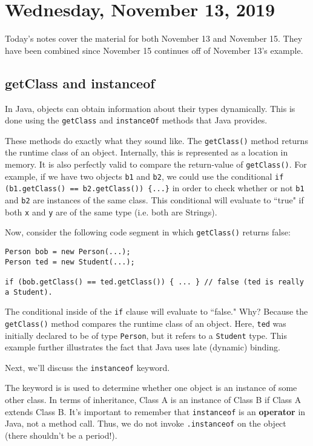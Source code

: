 \section{Wednesday, November 13, 2019}

Today's notes cover the material for both November 13 and November 15. They have been combined since November 15 continues off of November 13's example.

\subsection{getClass and instanceof}

In Java, objects can obtain information about their types dynamically. This is done using the \verb!getClass! and \verb!instanceOf! methods that Java provides. 


These methods do exactly what they sound like. The \verb!getClass()! method returns the runtime class of an object. Internally, this is represented as a location in memory. It is also perfectly valid to compare the return-value of \verb!getClass()!. For example, if we have two objects \verb!b1! and \verb!b2!, we could use the conditional \verb!if (b1.getClass() == b2.getClass()) {...}! in order to check whether or not \verb!b1! and \verb!b2! are instances of the same class. This conditional will evaluate to ``true" if both \verb!x! and \verb!y! are of the same type (i.e. both are Strings).


Now, consider the following code segment in which \verb!getClass()! returns false:

\begin{lstlisting}
Person bob = new Person(...);
Person ted = new Student(...);

if (bob.getClass() == ted.getClass()) { ... } // false (ted is really a Student).
\end{lstlisting}

The conditional inside of the \verb!if! clause will evaluate to ``false." Why? Because the \verb!getClass()! method compares the runtime class of an object. Here, \verb!ted! was initially declared to be of type \verb!Person!, but it refers to a \verb!Student! type. This example further illustrates the fact that Java uses late (dynamic) binding.



Next, we'll discuss the \verb!instanceof! keyword.

The \verb@instanceof@ keyword is is used to determine whether one object is an instance of some other class. In terms of inheritance, Class A is an instance of Class B if Class A extends Class B. It's important to remember that \verb!instanceof! is an \textbf{operator} in Java, not a method call. Thus, we do not invoke \verb!.instanceof! on the object (there shouldn't be a period!).


